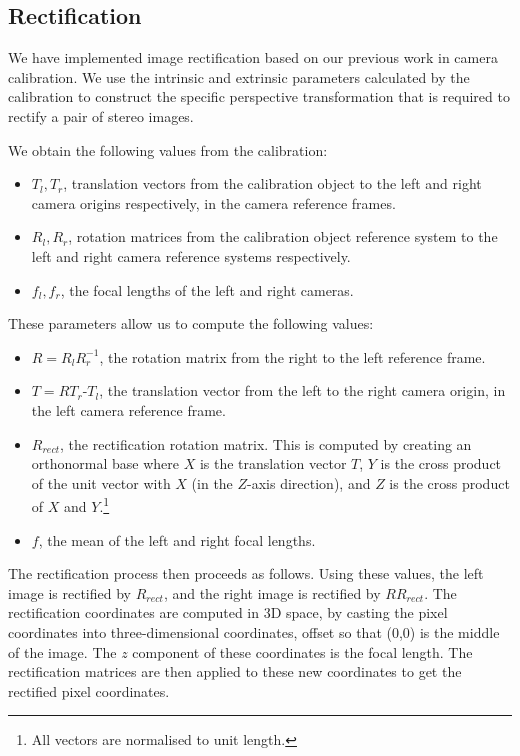 \subsection{Rectification}
\label{sec:rectification}

We have implemented image rectification based on our previous work in camera calibration.
We use the intrinsic and extrinsic parameters calculated by the calibration to
construct the specific perspective transformation that is required to rectify a pair of stereo images.

We obtain the following values from the calibration:
\begin{itemize}
\item $T_l, T_r$, translation vectors from the calibration object to the left
  and right camera origins respectively, in the camera reference frames.
\item $R_l, R_r$, rotation matrices from the calibration object reference system to
  the left and right camera reference systems respectively.
\item $f_l, f_r$, the focal lengths of the left and right cameras.
\end{itemize}

These parameters allow us to compute the following values:
\begin{itemize}
\item $R=R_lR_r^{-1}$, the rotation matrix from the right to the left reference
  frame.
\item $T=RT_r$-$T_l$, the translation vector from the left to the right camera
  origin, in the left camera reference frame.
\item $R_{rect}$, the rectification rotation matrix. This is computed by
  creating an orthonormal base where $X$ is the translation vector $T$, $Y$ is the cross
  product of the unit vector with $X$ (in the $Z$-axis direction), and $Z$ is the
  cross product of $X$ and $Y$.\footnote{ All vectors are normalised to unit length.}
\item $f$, the mean of the left and right focal lengths.
\end{itemize}

The rectification process then proceeds as follows. Using these values, the left image is
rectified by $R_{rect}$, and the right image is rectified by $RR_{rect}$. The
rectification coordinates are computed in 3D space, by casting the pixel
coordinates into three-dimensional coordinates, offset so that (0,0) is the
middle of the image. The $z$ component of these coordinates is the focal length. The rectification matrices are then applied to these new coordinates to get the rectified pixel coordinates.

